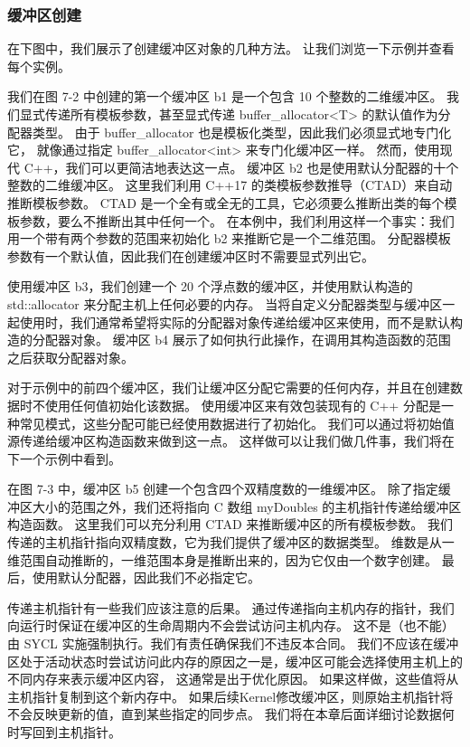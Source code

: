 \subsubsection{缓冲区创建}
在下图中，我们展示了创建缓冲区对象的几种方法。 让我们浏览一下示例并查看每个实例。

我们在图 7-2 中创建的第一个缓冲区 b1 是一个包含 10 个整数的二维缓冲区。 
我们显式传递所有模板参数，甚至显式传递 buffer\_allocator<T> 的默认值作为分配器类型。 
由于 buffer\_allocator 也是模板化类型，因此我们必须显式地专门化它，
就像通过指定 buffer\_allocator<int> 来专门化缓冲区一样。 然而，使用现代 C++，我们可以更简洁地表达这一点。 
缓冲区 b2 也是使用默认分配器的十个整数的二维缓冲区。 
这里我们利用 C++17 的类模板参数推导（CTAD）来自动推断模板参数。 
CTAD 是一个全有或全无的工具，它必须要么推断出类的每个模板参数，要么不推断出其中任何一个。 
在本例中，我们利用这样一个事实：我们用一个带有两个参数的范围来初始化 b2 来推断它是一个二维范围。 
分配器模板参数有一个默认值，因此我们在创建缓冲区时不需要显式列出它。

使用缓冲区 b3，我们创建一个 20 个浮点数的缓冲区，并使用默认构造的 std::allocator 来分配主机上任何必要的内存。 
当将自定义分配器类型与缓冲区一起使用时，我们通常希望将实际的分配器对象传递给缓冲区来使用，而不是默认构造的分配器对象。 
缓冲区 b4 展示了如何执行此操作，在调用其构造函数的范围之后获取分配器对象。

对于示例中的前四个缓冲区，我们让缓冲区分配它需要的任何内存，并且在创建数据时不使用任何值初始化该数据。 
使用缓冲区来有效包装现有的 C++ 分配是一种常见模式，这些分配可能已经使用数据进行了初始化。 
我们可以通过将初始值源传递给缓冲区构造函数来做到这一点。 这样做可以让我们做几件事，我们将在下一个示例中看到。

在图 7-3 中，缓冲区 b5 创建一个包含四个双精度数的一维缓冲区。 
除了指定缓冲区大小的范围之外，我们还将指向 C 数组 myDoubles 的主机指针传递给缓冲区构造函数。 
这里我们可以充分利用 CTAD 来推断缓冲区的所有模板参数。 
我们传递的主机指针指向双精度数，它为我们提供了缓冲区的数据类型。 
维数是从一维范围自动推断的，一维范围本身是推断出来的，因为它仅由一个数字创建。 
最后，使用默认分配器，因此我们不必指定它。

传递主机指针有一些我们应该注意的后果。 
通过传递指向主机内存的指针，我们向运行时保证在缓冲区的生命周期内不会尝试访问主机内存。 
这不是（也不能）由 SYCL 实施强制执行。我们有责任确保我们不违反本合同。 
我们不应该在缓冲区处于活动状态时尝试访问此内存的原因之一是，缓冲区可能会选择使用主机上的不同内存来表示缓冲区内容，
这通常是出于优化原因。 如果这样做，这些值将从主机指针复制到这个新内存中。 
如果后续Kernel修改缓冲区，则原始主机指针将不会反映更新的值，直到某些指定的同步点。 
我们将在本章后面详细讨论数据何时写回到主机指针。

